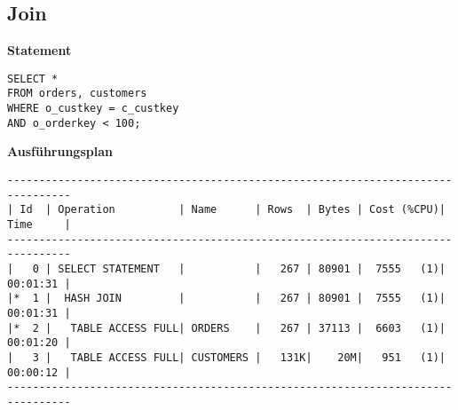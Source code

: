 \documentclass[10pt]{article}
\begin{document}
\subsection{Join}
\textbf{Statement}
\begin{lstlisting}[style=sql]
SELECT *
FROM orders, customers
WHERE o_custkey = c_custkey
AND o_orderkey < 100;
\end{lstlisting}
\textbf{Ausführungsplan}
\begin{lstlisting}[style=queryexecutionplan]
--------------------------------------------------------------------------------                                                                                                                                                                                                                             
| Id  | Operation          | Name      | Rows  | Bytes | Cost (%CPU)| Time     |                                                                                                                                                                                                                             
--------------------------------------------------------------------------------                                                                                                                                                                                                                             
|   0 | SELECT STATEMENT   |           |   267 | 80901 |  7555   (1)| 00:01:31 |                                                                                                                                                                                                                             
|*  1 |  HASH JOIN         |           |   267 | 80901 |  7555   (1)| 00:01:31 |                                                                                                                                                                                                                             
|*  2 |   TABLE ACCESS FULL| ORDERS    |   267 | 37113 |  6603   (1)| 00:01:20 |                                                                                                                                                                                                                             
|   3 |   TABLE ACCESS FULL| CUSTOMERS |   131K|    20M|   951   (1)| 00:00:12 |                                                                                                                                                                                                                             
-------------------------------------------------------------------------------- 
\end{lstlisting}  
\end{document}
